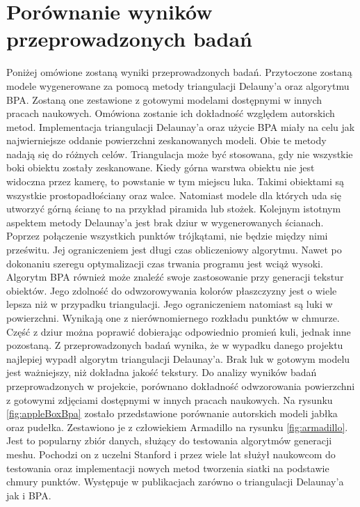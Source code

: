 \section{Porównanie wyników przeprowadzonych badań }
Poniżej omówione zostaną wyniki przeprowadzonych badań. Przytoczone zostaną modele wygenerowane za pomocą metody triangulacji Delauny'a oraz algorytmu BPA. Zostaną one zestawione z gotowymi modelami dostępnymi w innych pracach naukowych. Omówiona zostanie ich dokładność względem autorskich metod.
\newline \indent Implementacja triangulacji Delaunay'a oraz użycie BPA miały na celu jak najwierniejsze oddanie powierzchni zeskanowanych modeli. Obie te metody nadają się do różnych celów. Triangulacja może być stosowana, gdy nie wszystkie boki obiektu zostały zeskanowane. Kiedy górna warstwa obiektu nie jest widoczna przez kamerę, to powstanie w tym miejscu luka. Takimi obiektami są wszystkie prostopadłościany oraz walce. Natomiast modele dla których uda się utworzyć górną ścianę to na przykład piramida lub stożek. 
\newline \indent Kolejnym istotnym aspektem metody Delaunay'a jest brak dziur w wygenerowanych ścianach. Poprzez połączenie wszystkich punktów trójkątami, nie będzie między nimi prześwitu. Jej ograniczeniem jest długi czas obliczeniowy algorytmu. Nawet po dokonaniu szeregu optymalizacji czas trwania programu jest wciąż wysoki. 
\newline \indent Algorytm BPA również może znaleźć swoje zastosowanie przy generacji tekstur obiektów. Jego zdolność do odwzorowywania kolorów płaszczyzny jest o wiele lepsza niż w przypadku triangulacji. Jego ograniczeniem natomiast są luki w powierzchni. Wynikają one z nierównomiernego rozkładu punktów w chmurze. Część z dziur można poprawić dobierając odpowiednio promień kuli, jednak inne pozostaną. Z przeprowadzonych badań wynika, że w wypadku danego projektu najlepiej wypadł algorytm triangulacji Delaunay'a. Brak luk w gotowym modelu jest ważniejszy, niż dokładna jakość tekstury. 
\newline \indent Do analizy wyników badań przeprowadzonych w projekcie, porównano dokładność odwzorowania powierzchni z gotowymi zdjęciami dostępnymi w innych pracach naukowych. Na rysunku \ref{fig:appleBoxBpa} zostało przedstawione porównanie autorskich modeli jabłka oraz pudełka. Zestawiono je z człowiekiem Armadillo na rysunku \ref{fig:armadillo}. Jest to popularny zbiór danych, służący do testowania algorytmów generacji meshu. Pochodzi on z uczelni Stanford i przez wiele lat służył naukowcom do testowania oraz implementacji nowych metod tworzenia siatki na podstawie chmury punktów. Występuje w publikacjach zarówno o triangulacji Delaunay'a jak i BPA.  

